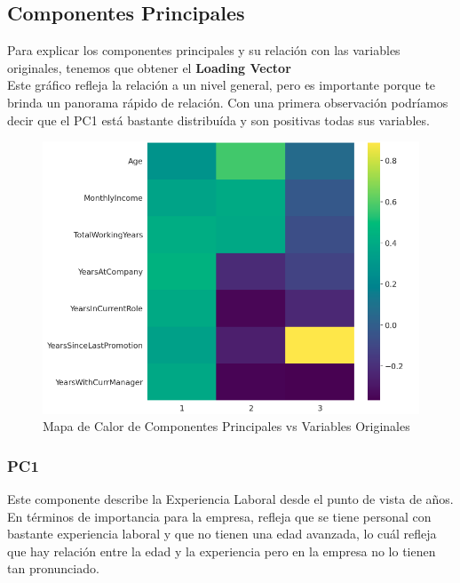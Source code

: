 \subsection{Componentes Principales}

Para explicar los componentes principales y su relación con las variables originales, tenemos que obtener el \textbf{Loading Vector} \\

Este gráfico refleja la relación a un nivel general, pero es importante porque te brinda un panorama rápido de relación. Con una
primera observación podríamos decir que el PC1 está bastante distribuída y son positivas todas sus variables.

\begin{figure}[H]
    \centering
    \includegraphics[width=1\textwidth]{images/heatmap_main_component.png}
    \caption{Mapa de Calor de Componentes Principales vs Variables Originales}
    \label{fig:heatmap_main_component}
\end{figure}

\subsubsection{PC1}

Este componente describe la Experiencia Laboral desde el punto de vista de años.
En términos de importancia para la empresa, refleja que se tiene personal con bastante experiencia laboral
y que no tienen una edad avanzada, lo cuál refleja que hay relación entre la edad y la experiencia pero en la empresa
no lo tienen tan pronunciado.

